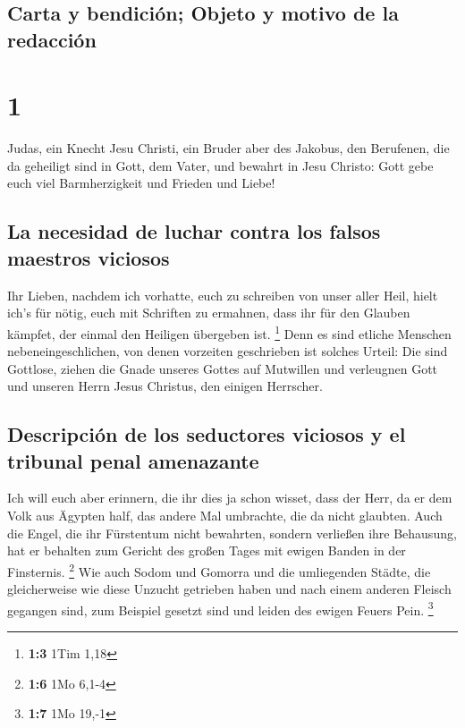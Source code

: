\hypertarget{carta-y-bendiciuxf3n-objeto-y-motivo-de-la-redacciuxf3n}{%
\subsection{Carta y bendición; Objeto y motivo de la
redacción}\label{carta-y-bendiciuxf3n-objeto-y-motivo-de-la-redacciuxf3n}}

\hypertarget{section}{%
\section{1}\label{section}}

 Judas, ein Knecht Jesu Christi, ein Bruder aber des
Jakobus, den Berufenen, die da geheiligt sind in Gott, dem Vater, und
bewahrt in Jesu Christo:  Gott gebe euch viel
Barmherzigkeit und Frieden und Liebe!

\hypertarget{la-necesidad-de-luchar-contra-los-falsos-maestros-viciosos}{%
\subsection{La necesidad de luchar contra los falsos maestros
viciosos}\label{la-necesidad-de-luchar-contra-los-falsos-maestros-viciosos}}

 Ihr Lieben, nachdem ich vorhatte, euch zu schreiben von
unser aller Heil, hielt ich's für nötig, euch mit Schriften zu ermahnen,
dass ihr für den Glauben kämpfet, der einmal den Heiligen übergeben ist.
\footnote{\textbf{1:3} 1Tim 1,18}  Denn es sind etliche
Menschen nebeneingeschlichen, von denen vorzeiten geschrieben ist
solches Urteil: Die sind Gottlose, ziehen die Gnade unseres Gottes auf
Mutwillen und verleugnen Gott und unseren Herrn Jesus Christus, den
einigen Herrscher.

\hypertarget{descripciuxf3n-de-los-seductores-viciosos-y-el-tribunal-penal-amenazante}{%
\subsection{Descripción de los seductores viciosos y el tribunal penal
amenazante}\label{descripciuxf3n-de-los-seductores-viciosos-y-el-tribunal-penal-amenazante}}

 Ich will euch aber erinnern, die ihr dies ja schon
wisset, dass der Herr, da er dem Volk aus Ägypten half, das andere Mal
umbrachte, die da nicht glaubten.  Auch die Engel, die ihr
Fürstentum nicht bewahrten, sondern verließen ihre Behausung, hat er
behalten zum Gericht des großen Tages mit ewigen Banden in der
Finsternis. \footnote{\textbf{1:6} 1Mo 6,1-4}  Wie auch
Sodom und Gomorra und die umliegenden Städte, die gleicherweise wie
diese Unzucht getrieben haben und nach einem anderen Fleisch gegangen
sind, zum Beispiel gesetzt sind und leiden des ewigen Feuers Pein.
\footnote{\textbf{1:7} 1Mo 19,-1}

